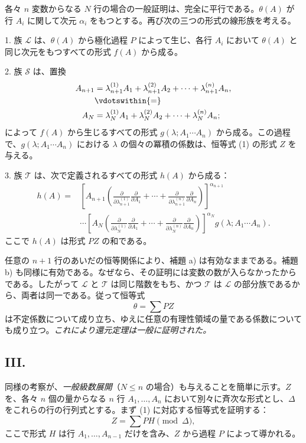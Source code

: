 各々 $n$ 変数からなる $N$ 行の場合の一般証明は、完全に平行である。$\theta(A)$ が行 $A_i$ に関して次元 $\alpha_i$ をもつとする。再び次の三つの形式の線形族を考える。

1. 族 $\mathcal L$ は、$\theta(A)$ から極化過程 $P$ によって生じ、各行 $A_i$ において $\theta(A)$ と同じ次元をもつすべての形式 $f(A)$ から成る。

2. 族 $\mathcal S$ は、置換
\[
\begin{aligned}
 A_{n+1}&=\lambda_{n+1}^{(1)}A_1+\lambda_{n+1}^{(2)}A_2+
        \cdots+\lambda_{n+1}^{(n)}A_n,\\
 &\vdotswithin{=}\\
 A_N&=\lambda_N^{(1)}A_1+\lambda_N^{(2)}A_2+
        \cdots+\lambda_N^{(n)}A_n;
\end{aligned}
\]
によって $f(A)$ から生じるすべての形式 $g(\lambda;A_1\cdots A_n)$ から成る。この過程で、$g(\lambda;A_1\cdots A_n)$ における $\lambda$ の個々の冪積の係数は、恒等式 (1) の形式 $Z$ を与える。

3. 族 $\mathcal T$ は、次で定義されるすべての形式 $h(A)$ から成る：
\[
\begin{aligned}
 h(A)=&\left[A_{n+1}\left(
 \frac{\partial}{\partial\lambda_{n+1}^{(1)}}\frac{\partial}{\partial A_1}
 +\cdots+
 \frac{\partial}{\partial\lambda_{n+1}^{(n)}}\frac{\partial}{\partial A_n}\right)\right]^{\alpha_{n+1}} \\
&\cdots
\left[A_N\left(
 \frac{\partial}{\partial\lambda_N^{(1)}}\frac{\partial}{\partial A_1}
 +\cdots+
 \frac{\partial}{\partial\lambda_N^{(n)}}\frac{\partial}{\partial A_n}\right)\right]^{\alpha_N}
 g(\lambda;A_1\cdots A_n).
\end{aligned}
\]
ここで $h(A)$ は形式 $PZ$ の和である。

任意の $n+1$ 行のあいだの恒等関係により、補題 a) は有効なままである。補題 b) も同様に有効である。なぜなら、その証明には変数の数が入らなかったからである。したがって $\mathcal L$ と $\mathcal T$ は同じ階数をもち、かつ $\mathcal T$ は $\mathcal L$ の部分族であるから、両者は同一である。従って恒等式
\[
  \theta=\sum PZ
\]
は不定係数について成り立ち、ゆえに任意の有理性領域の量である係数についても成り立つ。\emph{これにより還元定理は一般に証明された。}

\subsection*{III.}
同様の考察が、\emph{一般級数展開}（$N\le n$ の場合）も与えることを簡単に示す。$Z$ を、各々 $n$ 個の量からなる $n$ 行 $A_1,
\ldots,A_n$ において別々に斉次な形式とし、$\Delta$ をこれらの行の行列式とする。まず (1) に対応する恒等式を証明する：
\begin{equation}
  Z=\sum PH \pmod{\Delta},
\tag{2}
\end{equation}
ここで形式 $H$ は行 $A_1,
\ldots,A_{n-1}$ だけを含み、$Z$ から過程 $P$ によって導かれる。


